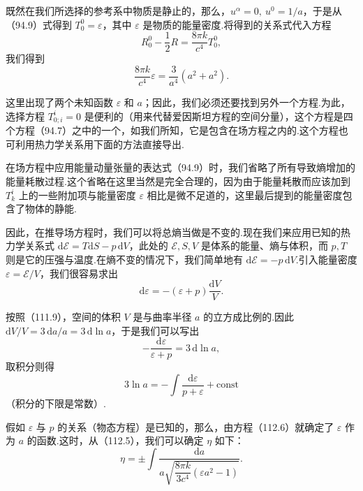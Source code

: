 既然在我们所选择的参考系中物质是静止的，那么，$u^{\alpha}=0,\ u^{0}=1/a$，于是从（94.9）式得到 $T_{0}^{0}=\varepsilon$，其中 $\varepsilon$ 是物质的能量密度.将得到的关系式代入方程
\begin{equation*}
  R_{0}^{0}-\frac{1}{2}R=\frac{8\pi k}{c^{4}}T_{0}^{0},
\end{equation*}
我们得到
\begin{equation}
  \frac{8\pi k}{c^{4}}\varepsilon=\frac{3}{a^{4}}(a^{2}+a^{2}).
\end{equation}

这里出现了两个未知函数 $\varepsilon$ 和 $a$；因此，我们必须还要找到另外一个方程.为此，选择方程 $T_{0;i}^{i}=0$ 是便利的（用来代替爱因斯坦方程的空间分量），这个方程是四个方程（94.7）之中的一个，如我们所知，它是包含在场方程之内的.这个方程也可利用热力学关系用下面的方法直接导出.

在场方程中应用能量动量张量的表达式（94.9）时，我们省略了所有导致熵增加的能量耗散过程.这个省略在这里当然是完全合理的，因为由于能量耗散而应该加到 $T_{k}^{i}$ 上的一些附加项与能量密度 $\varepsilon$ 相比是微不足道的，这里最后提到的能量密度包含了物体的静能.

因此，在推导场方程时，我们可以将总熵当做是不变的.现在我们来应用已知的热力学关系式 $\mathrm{d}\mathcal{E}=T\mathrm{d}S-p\,\mathrm{d}V$，此处的 $\mathcal{E},S,V$ 是体系的能量、熵与体积，而 $p,T$ 则是它的压强与温度.在熵不变的情况下，我们简单地有 $\mathrm{d}\mathcal{E}=-p\,\mathrm{d}V$.引入能量密度 $\varepsilon=\mathcal{E}/V$，我们很容易求出
\begin{equation*}
  \mathrm{d}\varepsilon=-(\varepsilon+p)\frac{\mathrm{d}V}{V}.
\end{equation*}

按照（111.9），空间的体积 $V$ 是与曲率半径 $a$ 的立方成比例的.因此 $\mathrm{d}V/V=3\,\mathrm{d}a/a=3\,\mathrm{d}\ln a$，于是我们可以写出
\begin{equation*}
  -\frac{\mathrm{d}\varepsilon}{\varepsilon+p}=3\,\mathrm{d}\ln a,
\end{equation*}
取积分则得
\begin{equation}
  3\ln a=-\int\frac{\mathrm{d}\varepsilon}{p+\varepsilon}+\mathrm{const}
\end{equation}
（积分的下限是常数）.

假如 $\varepsilon$ 与 $p$ 的关系（物态方程）是已知的，那么，由方程（112.6）就确定了 $\varepsilon$ 作为 $a$ 的函数.这时，从（112.5），我们可以确定 $\eta$ 如下：
\begin{equation}
  \eta=\pm\int\frac{\mathrm{d}a}
  {a\sqrt{\dfrac{8\pi k}{3c^{4}}(\varepsilon a^{2}-1)}}.
\end{equation}


